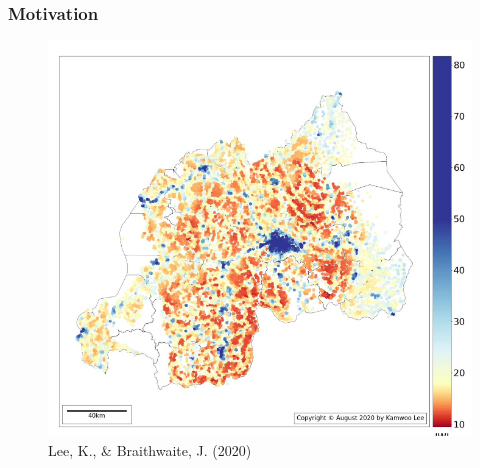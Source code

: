 \documentclass[
  shownotes,
  xcolor={svgnames},
  hyperref={colorlinks,citecolor=DarkBlue,linkcolor=DarkRed,urlcolor=DarkBlue}
   , aspectratio=169]{beamer}
\begin{document}
\begin{frame}[fragile]
\frametitle{Motivation}

\begin{figure}[H] \centering
  \centering
  \includegraphics[scale=0.5]{figures/lee_rwanda}
  \\
  \tiny Lee, K., \& Braithwaite, J. (2020)
\end{figure}


\end{frame}

\end{document}
